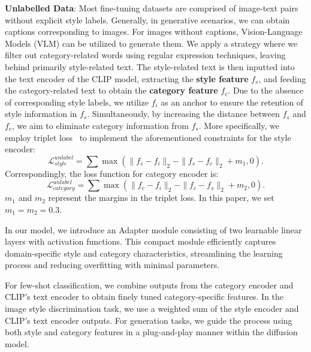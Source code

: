 \textbf{Unlabelled Data}: Most fine-tuning datasets are comprised of image-text pairs without explicit style labels. 
Generally, in generative scenarios, we can obtain captions corresponding to images. For images without captions, Vision-Language Models (VLM) can be utilized to generate them. We apply a strategy where we filter out category-related words using regular expression techniques, leaving behind primarily style-related text. The style-related text is then inputted into the text encoder of the CLIP model, extracting the \textbf{style feature} $f_{s}$, and feeding the category-related text to obtain the \textbf{category feature} $f_{c}$. 
Due to the absence of corresponding style labels, we utilize $f_i$ as an anchor to ensure the retention of style information in $f_s$. Simultaneously, by increasing the distance between $f_s$ and $f_c$, we aim to eliminate category information from $f_s$. More specifically, we employ triplet loss~\cite{schroff2015facenet} to implement the aforementioned constraints for the style encoder:
\begin{equation}
\mathcal{L}_{style}^{unlabel}= \sum \max (\|f_{s}-f_{i}\|_2 - \|f_{s}-f_{c}\|_2+m_1, 0).
\end{equation}
Correspondingly, the loss function for category encoder is:
\begin{equation}
\mathcal{L}_{category}^{unlabel}= \sum \max (\|f_{c}-f_{i}\|_2 - \|f_{c}-f_{s}\|_2+m_2, 0).
\end{equation}
$m_1$ and $m_2$ represent the margins in the triplet loss. In this paper, we set $m_1 = m_2 = 0.3$.

In our model, we introduce an Adapter module consisting of two learnable linear layers with activation functions. This compact module efficiently captures domain-specific style and category characteristics, streamlining the learning process and reducing overfitting with minimal parameters.

For few-shot classification, we combine outputs from the category encoder and CLIP's text encoder to obtain finely tuned category-specific features. In the image style discrimination task, we use a weighted sum of the style encoder and CLIP's text encoder outputs. For generation tasks, we guide the process using both style and category features in a plug-and-play manner within the diffusion model.

